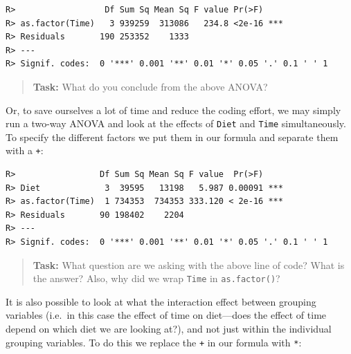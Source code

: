 \documentclass[english,10pt,a4paper,oneside]{book}
\newenvironment{Shaded}{\begin{snugshade}}{\end{snugshade}}
\newcommand{\KeywordTok}[1]{\textcolor[rgb]{0.13,0.29,0.53}{\textbf{#1}}}
\newcommand{\DataTypeTok}[1]{\textcolor[rgb]{0.13,0.29,0.53}{#1}}
\newcommand{\DecValTok}[1]{\textcolor[rgb]{0.00,0.00,0.81}{#1}}
\newcommand{\StringTok}[1]{\textcolor[rgb]{0.31,0.60,0.02}{#1}}
\newcommand{\OperatorTok}[1]{\textcolor[rgb]{0.81,0.36,0.00}{\textbf{#1}}}
\newcommand{\NormalTok}[1]{#1}
\theoremstyle{definition}
\theoremstyle{definition}
\theoremstyle{definition}
\theoremstyle{remark}
\begin{document}
\begin{verbatim}
R>                  Df Sum Sq Mean Sq F value Pr(>F)    
R> as.factor(Time)   3 939259  313086   234.8 <2e-16 ***
R> Residuals       190 253352    1333                   
R> ---
R> Signif. codes:  0 '***' 0.001 '**' 0.01 '*' 0.05 '.' 0.1 ' ' 1
\end{verbatim}

\begin{quote}
\textbf{Task:} What do you conclude from the above ANOVA?
\end{quote}

Or, to save ourselves a lot of time and reduce the coding effort, we may
simply run a two-way ANOVA and look at the effects of \texttt{Diet} and
\texttt{Time} simultaneously. To specify the different factors we put
them in our formula and separate them with a \texttt{+}:

\begin{Shaded}
\end{Shaded}

\begin{verbatim}
R>                 Df Sum Sq Mean Sq F value  Pr(>F)    
R> Diet             3  39595   13198   5.987 0.00091 ***
R> as.factor(Time)  1 734353  734353 333.120 < 2e-16 ***
R> Residuals       90 198402    2204                    
R> ---
R> Signif. codes:  0 '***' 0.001 '**' 0.01 '*' 0.05 '.' 0.1 ' ' 1
\end{verbatim}

\begin{quote}
\textbf{Task:} What question are we asking with the above line of code?
What is the answer? Also, why did we wrap \texttt{Time} in
\texttt{as.factor()}?
\end{quote}

It is also possible to look at what the interaction effect between
grouping variables (i.e.~in this case the effect of time on diet---does
the effect of time depend on which diet we are looking at?), and not
just within the individual grouping variables. To do this we replace the
\texttt{+} in our formula with \texttt{*}:
\end{document}
